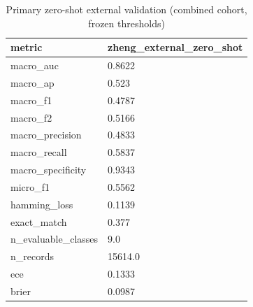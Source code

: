 \begin{table}[htbp]\centering\small
\caption{Primary zero-shot external validation (combined cohort, frozen thresholds)}\label{tab:extclean}
\begin{tabular}{ll}
\hline
metric & zheng_external_zero_shot \\
\hline
macro_auc & 0.8622 \\
macro_ap & 0.523 \\
macro_f1 & 0.4787 \\
macro_f2 & 0.5166 \\
macro_precision & 0.4833 \\
macro_recall & 0.5837 \\
macro_specificity & 0.9343 \\
micro_f1 & 0.5562 \\
hamming_loss & 0.1139 \\
exact_match & 0.377 \\
n_evaluable_classes & 9.0 \\
n_records & 15614.0 \\
ece & 0.1333 \\
brier & 0.0987 \\
\hline
\end{tabular}
\end{table}
